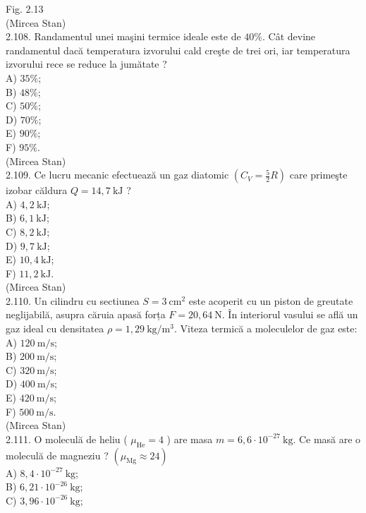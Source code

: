 Fig. 2.13\\
(Mircea Stan)\\
2.108. Randamentul unei maşini termice ideale este de $40 \%$. Cât devine randamentul dacă temperatura izvorului cald creşte de trei ori, iar temperatura izvorului rece se reduce la jumătate ?\\
A) $35 \%$;\\
B) $48 \%$;\\
C) $50 \%$;\\
D) $70 \%$;\\
E) $90 \%$;\\
F) $95 \%$.\\
(Mircea Stan)\\
2.109. Ce lucru mecanic efectuează un gaz diatomic $\left(C_{V}=\frac{5}{2} R\right)$ care primeşte izobar căldura $Q=14,7 \mathrm{~kJ}$ ?\\
A) $4,2 \mathrm{~kJ}$;\\
B) $6,1 \mathrm{~kJ}$;\\
C) $8,2 \mathrm{~kJ}$;\\
D) $9,7 \mathrm{~kJ}$;\\
E) $10,4 \mathrm{~kJ}$;\\
F) $11,2 \mathrm{~kJ}$.\\
(Mircea Stan)\\
2.110. Un cilindru cu sectiunea $S=3 \mathrm{~cm}^{2}$ este acoperit cu un piston de greutate neglijabilă, asupra căruia apasă forța $F=20,64 \mathrm{~N}$. În interiorul vasului se află un gaz ideal cu densitatea $\rho=1,29 \mathrm{~kg} / \mathrm{m}^{3}$. Viteza termică a moleculelor de gaz este:\\
A) $120 \mathrm{~m} / \mathrm{s}$;\\
B) $200 \mathrm{~m} / \mathrm{s}$;\\
C) $320 \mathrm{~m} / \mathrm{s}$;\\
D) $400 \mathrm{~m} / \mathrm{s}$;\\
E) $420 \mathrm{~m} / \mathrm{s}$;\\
F) $500 \mathrm{~m} / \mathrm{s}$.\\
(Mircea Stan)\\
2.111. O moleculă de heliu ( $\mu_{\mathrm{He}}=4$ ) are masa $m=6,6 \cdot 10^{-27} \mathrm{~kg}$. Ce masă are o moleculă de magneziu ? $\left(\mu_{\mathrm{Mg}} \approx 24\right)$\\
A) $8,4 \cdot 10^{-27} \mathrm{~kg}$;\\
B) $6,21 \cdot 10^{-26} \mathrm{~kg}$;\\
C) $3,96 \cdot 10^{-26} \mathrm{~kg}$;\\
